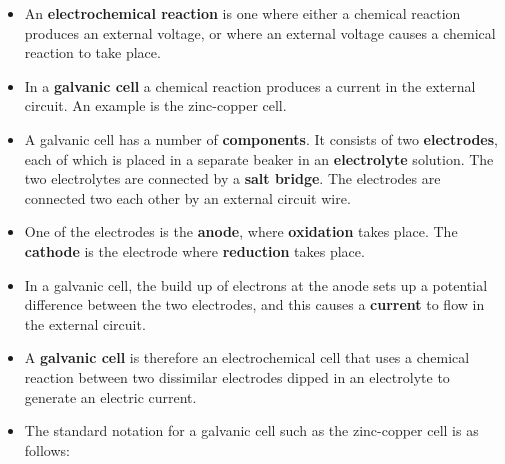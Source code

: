 \begin{itemize}
\item{An \textbf{electrochemical reaction} is one where either a chemical reaction produces an external voltage, or where an external voltage causes a chemical reaction to take place.}
\item{In a \textbf{galvanic cell} a chemical reaction produces a current in the external circuit. An example is the zinc-copper cell.}
\item{A galvanic cell has a number of \textbf{components}. It consists of two \textbf{electrodes}, each of which is placed in a separate beaker in an \textbf{electrolyte} solution. The two electrolytes are connected by a \textbf{salt bridge}. The electrodes are connected two each other by an external circuit wire.}
\item{One of the electrodes is the \textbf{anode}, where \textbf{oxidation} takes place. The \textbf{cathode} is the electrode where \textbf{reduction} takes place.}
\item{In a galvanic cell, the build up of electrons at the anode sets up a potential difference between the two electrodes, and this causes a \textbf{current} to flow in the external circuit.}   
\item{A \textbf{galvanic cell} is therefore an electrochemical cell that uses a chemical reaction between two dissimilar electrodes dipped in an electrolyte to generate an electric current.}
\item{The standard notation for a galvanic cell such as the zinc-copper cell is as follows:

}
\end{itemize}
